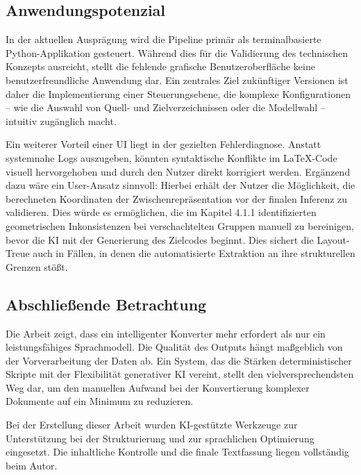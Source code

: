 \documentclass[a4paper]{article}
\begin{document}
\subsection{Anwendungspotenzial}
In der aktuellen Ausprägung wird die Pipeline primär als terminalbasierte Python-Applikation gesteuert. Während dies für die Validierung des technischen Konzepts ausreicht, stellt die fehlende grafische Benutzeroberfläche keine benutzerfreundliche Anwendung dar. Ein zentrales Ziel zukünftiger Versionen ist daher die Implementierung einer Steuerungsebene, die komplexe Konfigurationen – wie die Auswahl von Quell- und Zielverzeichnissen oder die Modellwahl – intuitiv zugänglich macht.

Ein weiterer Vorteil einer UI liegt in der gezielten Fehlerdiagnose. Anstatt systemnahe Logs auszugeben, könnten syntaktische Konflikte im LaTeX-Code visuell hervorgehoben und durch den Nutzer direkt korrigiert werden. Ergänzend dazu wäre ein User-Ansatz sinnvoll: Hierbei erhält der Nutzer die Möglichkeit, die berechneten Koordinaten der Zwischenrepräsentation vor der finalen Inferenz zu validieren. Dies würde es ermöglichen, die im Kapitel 4.1.1 identifizierten geometrischen Inkonsistenzen bei verschachtelten Gruppen manuell zu bereinigen, bevor die KI mit der Generierung des Zielcodes beginnt. Dies sichert die Layout-Treue auch in Fällen, in denen die automatisierte Extraktion an ihre strukturellen Grenzen stößt.

\subsection{Abschließende Betrachtung}
Die Arbeit zeigt, dass ein intelligenter Konverter mehr erfordert als nur ein leistungsfähiges Sprachmodell. Die Qualität des Outputs hängt maßgeblich von der Vorverarbeitung der Daten ab. Ein System, das die Stärken deterministischer Skripte mit der Flexibilität generativer KI vereint, stellt den vielversprechendsten Weg dar, um den manuellen Aufwand bei der Konvertierung komplexer Dokumente auf ein Minimum zu reduzieren.


	
	\newpage
	 Bei der Erstellung dieser Arbeit wurden KI-gestützte Werkzeuge zur Unterstützung bei der Strukturierung und zur sprachlichen Optimierung eingesetzt. Die inhaltliche Kontrolle und die finale Textfassung liegen vollständig beim Autor.
		\newpage
	


\end{document}
